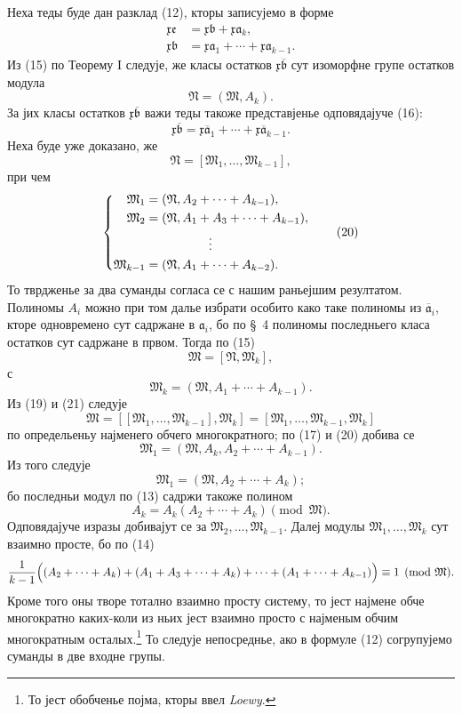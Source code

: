 ﻿\documentclass[11pt]{article}
\providecommand{\mM}{\mathfrak M}
\providecommand{\mN}{\mathfrak N}
\providecommand{\ma}{\mathfrak a}
\providecommand{\mb}{\mathfrak b}
\providecommand{\me}{\mathfrak e}
\providecommand{\mx}{\mathfrak x}
\begin{document}
Неха теды буде дан разклад (12), кторы записујемо в форме
\begin{align}
 \mx\me&=\mx\mb+\mx\ma_k,\tag{15}\\
 \mx\mb&=\mx\ma_1+\cdots+\mx\ma_{k-1}.\tag{16}
\end{align}
Из (15) по Теорему I следује, же класы остатков \(\mx\overline{\mb}\) сут изоморфне групе остатков модула
\begin{equation}
 \mN=(\mM,A_k).
\tag{17}
\end{equation}
За јих класы остатков \(\mx\overline{\mb}\) важи теды такоже представјенье одповядајуче (16):
\begin{equation}
 \mx\overline{\mb}=\mx\overline{\ma}_1+\cdots+\mx\overline{\ma}_{k-1}.
\tag{18}
\end{equation}
Неха буде уже доказано, же
\begin{equation}
 \mN=[\mM_1,\ldots,\mM_{k-1}],
\tag{19}
\end{equation}
при чем
\begin{equation}
\left\{
\begin{aligned}
 \mM_1&=(\mN,A_2+\cdots+A_{k-1}),\\
 \mM_2&=(\mN,A_1+A_3+\cdots+A_{k-1}),\\
 &\hspace{1.8cm}\vdots\\
 \mM_{k-1}&=(\mN,A_1+\cdots+A_{k-2}).
\end{aligned}\right.
\tag{20}
\end{equation}
То тврдженье за два суманды согласа се с нашим раньејшим резултатом. Полиномы \(A_i\) можно при том далье избрати особито како таке полиномы из \(\overline{\ma}_i\), кторе одновремено сут садржане в \(\ma_i\), бо по \S~4 полиномы последньего класа остатков сут садржане в првом. Тогда по (15)
\begin{equation}
 \mM=[\mN,\mM_k],
\tag{21}
\end{equation}
с
\[
 \mM_k=(\mM,A_1+\cdots+A_{k-1}).
\]
Из (19) и (21) следује
\[
 \mM=[[\mM_1,\ldots,\mM_{k-1}],\mM_k]=[\mM_1,\ldots,\mM_{k-1},\mM_k]
\]
по определьеньу најменего обчего многократного; по (17) и (20) добива се
\[
 \mM_1=(\mM,A_k,A_2+\cdots+A_{k-1}).
\]
Из того следује
\[
 \mM_1=(\mM,A_2+\cdots+A_k);
\]
бо последньи модул по (13) садржи такоже полином
\[
 A_k=A_k(A_2+\cdots+A_k)\pmod{\mM}.
\]
Одповядајуче изразы добивајут се за \(\mM_2,\ldots,\mM_{k-1}\). Далеј модулы \(\mM_1,\ldots,\mM_k\) сут взаимно просте, бо по (14)
\[
 \frac{1}{k-1}\Bigl((A_2+\cdots+A_k)+(A_1+A_3+\cdots+A_k)+\cdots+(A_1+\cdots+A_{k-1})\Bigr)\equiv1\pmod{\mM}.
\]
Кроме того оны творе тотално взаимно просту систему, то јест најмене обче многократно каких-коли из ньих јест взаимно просто с најменым обчим многократным осталых.\footnote{То јест обобченье појма, кторы ввел \emph{Loewy}.} То следује непосреднье, ако в формуле (12) согрупујемо суманды в две входне групы.
\end{document}
